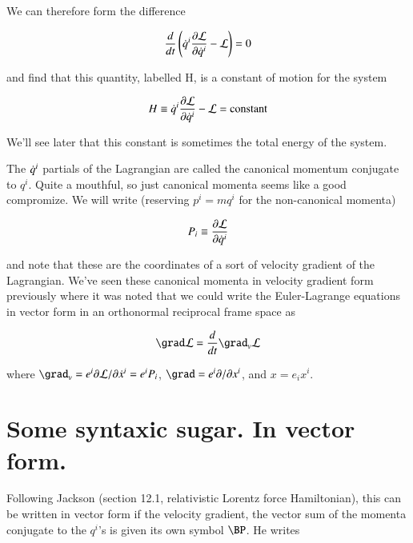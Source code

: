 We can therefore form the difference 

\begin{align}\label{eqn:hamiltonian:foo1}
\frac{d}{dt} \left( \dot{q}^i \frac{\partial {\mathcal{L}}}{\partial {\dot{q}^i}} -\mathcal{L} \right) = 0
\end{align}

and find that this quantity, labelled H, is a constant of motion for the system

\begin{align}\label{eqn:hamiltonian:foo2}
H \equiv \dot{q}^i \frac{\partial {\mathcal{L}}}{\partial {\dot{q}^i}} -\mathcal{L} = \text{constant}
\end{align}

We'll see later that this constant is sometimes the total energy of the system.

The $\dot{q}^i$ partials of the Lagrangian are called the canonical momentum conjugate to $q^i$.  Quite a mouthful, so just canonical momenta seems like a good compromize.  We will write (reserving $p^i = m q^i$ for the non-canonical momenta)

\begin{align}\label{eqn:hamiltonian:foo2b}
P_i \equiv \frac{\partial {\mathcal{L}}}{\partial {\dot{q}^i}}
\end{align}

and note that these are the coordinates of a sort of velocity gradient of the Lagrangian.  We've seen these canonical momenta in velocity gradient form previously where it was noted that we could write the Euler-Lagrange equations in vector form in an orthonormal reciprocal frame space as

\begin{align}\label{eqn:hamiltonian:foo9}
\grad \LL = \frac{d}{dt} \grad_v \LL
\end{align}

where $\grad_v = e^i \partial \LL/\partial \xdot^i = e^i P_i$, $\grad = e^i \partial/\partial x^i$, and $x = e_i x^i$.


\section{Some syntaxic sugar.  In vector form.}

Following Jackson \cite{jackson1975cew} (section 12.1, relativistic Lorentz force Hamiltonian), this can be written in vector form if the velocity gradient, the vector sum of the momenta conjugate to the $q^i$'s is given its own symbol $\BP$.  He writes


